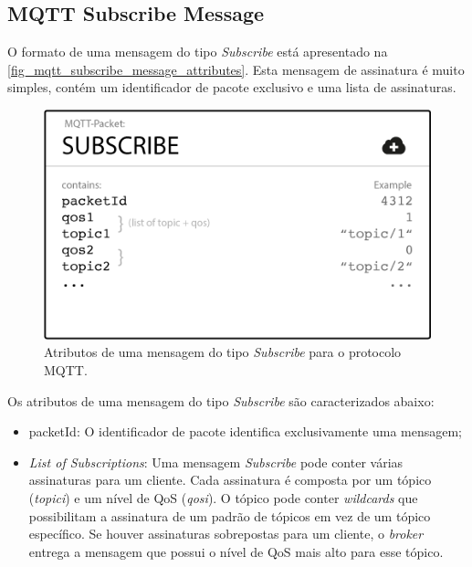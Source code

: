 \documentclass[
    12pt,
    openright,
    twoside,
    a4paper,
    english,
    spanish,
    brazil,
    ]{abntex2}
\begin{document}
\subsection{MQTT Subscribe Message}\label{section_mqtt_subscribe_message}
O formato de uma mensagem do tipo \textit{Subscribe} está apresentado na \autoref{fig_mqtt_subscribe_message_attributes}. Esta mensagem de assinatura é muito simples, contém um identificador de pacote exclusivo e uma lista de assinaturas.
\begin{figure}[htb]
	\begin{center}
		\caption{Atributos de uma mensagem do tipo \textit{Subscribe} para o protocolo MQTT.}\label{fig_mqtt_subscribe_message_attributes}
		\includegraphics[scale=0.5]{Images/mqtt_subscribe_message_attributes.png}
	\end{center}
\end{figure}

Os atributos de uma mensagem do tipo \textit{Subscribe} são caracterizados abaixo:
\begin{itemize}
	\item packetId: O identificador de pacote identifica exclusivamente uma mensagem;
	\item \textit{List of Subscriptions}: Uma mensagem \textit{Subscribe} pode conter várias assinaturas para um cliente. Cada assinatura é composta por um tópico (\textit{topici}) e um nível de QoS (\textit{qosi}). O tópico pode conter \textit{wildcards} que possibilitam a assinatura de um padrão de tópicos em vez de um tópico específico. Se houver assinaturas sobrepostas para um cliente, o \textit{broker} entrega a mensagem que possui o nível de QoS mais alto para esse tópico.
\end{itemize}

\end{document}
